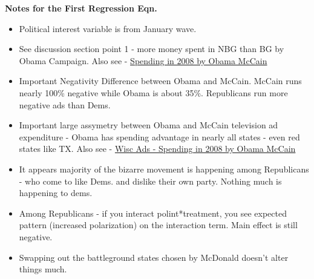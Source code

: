 \documentclass[doc,fignum,noapacite]{apa}
\begin{document}
\textbf{Notes for the First Regression Eqn.}
\begin{itemize}
\item Political interest variable is from January wave.\\
\item See discussion section point 1 - more money spent in NBG than BG by Obama Campaign. Also see -
\href{http://wiscadproject.wisc.edu/wiscads_release_100808.pdf}{Spending in 2008 by Obama McCain}
\item Important Negativity Difference between Obama and McCain. McCain runs nearly 100\% negative while Obama is about
35\%. Republicans run more negative ads than Dems.
\item Important large assymetry between Obama and McCain television ad expenditure - Obama has spending advantage 
in nearly all states - even red states like TX. Also see -
\href{http://wiscadproject.wisc.edu/wiscads_release_100808.pdf}{Wisc Ads - Spending in 2008 by Obama McCain}
\item It appears majority of the bizarre movement is happening among Republicans - who come to like Dems. and dislike
their own party.  Nothing much is happening to dems.\\
\item Among Republicans - if you interact polint*treatment, you see expected pattern (increased polarization) on the
	   interaction term. Main effect is still negative.\\
\item Swapping out the battleground states chosen by McDonald doesn't alter things much.
\end{itemize} 
\end{document}
